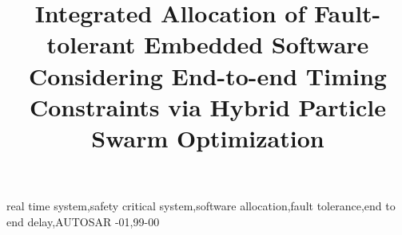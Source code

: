 \documentclass[preprint]{elsarticle}
\begin{document}
\sloppy
\begin{frontmatter}
\title{Integrated Allocation of Fault-tolerant Embedded Software Considering End-to-end Timing Constraints via Hybrid Particle Swarm Optimization}


\begin{keyword}
real time system\sep safety critical system\sep software allocation\sep fault tolerance\sep end to end delay\sep AUTOSAR
-01\sep  99-00
\end{keyword}

\end{frontmatter}





%
%








\end{document}
